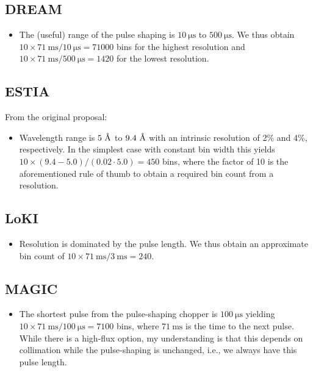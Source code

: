 \documentclass[a4paper,english,numbers=noenddot,bibliography=totoc,chapterprefix=on,DIV=12]{scrartcl}
\newcommand{\angstrom}{\textup{\AA}}
\newcommand{\dream}{DREAM\xspace}
\newcommand{\estia}{ESTIA\xspace}
\newcommand{\loki}{LoKI\xspace}
\newcommand{\magic}{MAGIC\xspace}
\begin{document}
\subsection{\dream}

\begin{itemize}
  \item The (useful) range of the pulse shaping is $10~\mathrm{\mu s}$ to $500~\mathrm{\mu s}$.
    We thus obtain $10\times71~\mathrm{ms}/10~\mathrm{\mu s} = 71000$ bins for the highest resolution and $10\times71~\mathrm{ms}/500~\mathrm{\mu s} = 1420$ for the lowest resolution.
\end{itemize}


\subsection{\estia}

From the original proposal:

\begin{itemize}
  \item Wavelength range is $5~\angstrom$ to $9.4~\angstrom$ with an intrinsic resolution of 2\% and 4\%, respectively.
    In the simplest case with constant bin width this yields $10\times(9.4-5.0)/(0.02\cdot5.0) = 450$ bins, where the factor of 10 is the aforementioned rule of thumb to obtain a required bin count from a resolution.
\end{itemize}


\subsection{\loki}

\begin{itemize}
  \item Resolution is dominated by the pulse length.
    We thus obtain an approximate bin count of  $10\times71~\mathrm{ms}/3~\mathrm{ms} = 240$.
\end{itemize}


\subsection{\magic}

\begin{itemize}
  \item The shortest pulse from the pulse-shaping chopper is $100~\mathrm{\mu s}$ yielding $10\times71~\mathrm{ms}/100~\mathrm{\mu s} = 7100$ bins, where $71~\mathrm{ms}$ is the time to the next pulse.
    While there is a high-flux option, my understanding is that this depends on collimation while the pulse-shaping is unchanged, i.e., we always have this pulse length.
\end{itemize}
\end{document}
